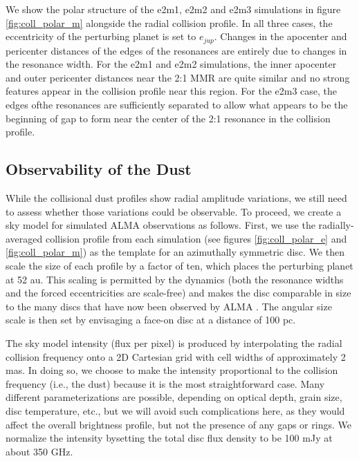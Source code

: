 We show the polar structure of the e2m1, e2m2 and e2m3 simulations in figure \ref{fig:coll_polar_m} alongside the radial 
collision profile. In all three cases, the eccentricity of the perturbing planet is set to $e_{jup}$. Changes in the apocenter and 
pericenter distances of the edges of the resonances are entirely due to changes in the resonance width. For the e2m1 and e2m2 
simulations, the inner apocenter and outer pericenter distances near the 2:1 MMR are quite similar and no strong features 
appear in the collision profile near this region. For the e2m3 case, the edges ofthe resonances are sufficiently separated to allow 
what appears to be the beginning of gap to form near the center of the 2:1 resonance in the collision profile.

\subsection{Observability of the Dust}

While the collisional dust profiles show radial amplitude variations, we still need to assess whether those variations could be 
observable. To proceed, we create a sky model for simulated ALMA observations as follows. First, we use the radially-averaged 
collision profile from each simulation (see figures \ref{fig:coll_polar_e} and \ref{fig:coll_polar_m}) as the template for an 
azimuthally symmetric disc. We then scale the size of each profile by a factor of ten, which places the perturbing planet at 52 au. 
This scaling is permitted by the dynamics (both the resonance widths and the forced eccentricities are scale-free) and makes the 
disc comparable in size to the many discs that have now been observed by ALMA \cite{huang18}. The angular size scale is then 
set by envisaging a face-on disc at a distance of 100 pc.  

The sky model intensity (flux per pixel) is produced by interpolating the radial collision frequency onto a 2D Cartesian grid with 
cell widths of approximately 2 mas. In doing so, we choose to make the intensity proportional to the collision frequency (i.e., the 
dust) because it is the most straightforward case. Many different parameterizations are possible, depending on optical depth, 
grain size, disc temperature, etc., but we will avoid such complications here, as they would affect the overall brightness profile, 
but not the presence of any gaps or rings. We normalize the intensity bysetting the total disc flux density to be 100 mJy at about 
350 GHz.  

